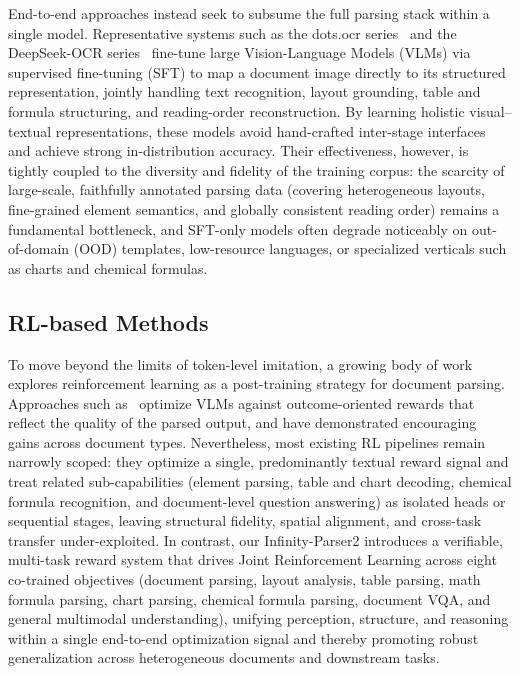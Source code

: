 End-to-end approaches instead seek to subsume the full parsing stack within a single model. Representative systems such as the dots.ocr series~\cite{dotsocr2025,zheng2026multimodalocrparsedocuments} and the DeepSeek-OCR series~\cite{wei2025deepseek,wei2026deepseek2} fine-tune large Vision-Language Models (VLMs) via supervised fine-tuning (SFT) to map a document image directly to its structured representation, jointly handling text recognition, layout grounding, table and formula structuring, and reading-order reconstruction. By learning holistic visual--textual representations, these models avoid hand-crafted inter-stage interfaces and achieve strong in-distribution accuracy. Their effectiveness, however, is tightly coupled to the diversity and fidelity of the training corpus: the scarcity of large-scale, faithfully annotated parsing data (covering heterogeneous layouts, fine-grained element semantics, and globally consistent reading order) remains a fundamental bottleneck, and SFT-only models often degrade noticeably on out-of-domain (OOD) templates, low-resource languages, or specialized verticals such as charts and chemical formulas.

\subsection{RL-based Methods}

To move beyond the limits of token-level imitation, a growing body of work explores reinforcement learning as a post-training strategy for document parsing. Approaches such as~\cite{wang2025infinity, chen2025logics, poznanski2025olmocr2, ling2025table2latex} optimize VLMs against outcome-oriented rewards that reflect the quality of the parsed output, and have demonstrated encouraging gains across document types. Nevertheless, most existing RL pipelines remain narrowly scoped: they optimize a single, predominantly textual reward signal and treat related sub-capabilities (element parsing, table and chart decoding, chemical formula recognition, and document-level question answering) as isolated heads or sequential stages, leaving structural fidelity, spatial alignment, and cross-task transfer under-exploited. In contrast, our Infinity-Parser2 introduces a verifiable, multi-task reward system that drives Joint Reinforcement Learning across eight co-trained objectives (document parsing, layout analysis, table parsing, math formula parsing, chart parsing, chemical formula parsing, document VQA, and general multimodal understanding), unifying perception, structure, and reasoning within a single end-to-end optimization signal and thereby promoting robust generalization across heterogeneous documents and downstream tasks.
